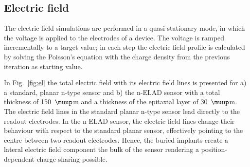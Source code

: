 \documentclass[a4paper,11pt]{article}
\begin{document}
\subsection{Electric field}
\label{sec:ef}
The electric field simulations are performed in a quasi-stationary mode, in which the voltage is applied to the electrodes of a device.
The voltage is ramped incrementally to a target value; in each step the electric field profile is calculated
 by solving the Poisson's equation with the charge density from the previous iteration as starting value.

In Fig.~\ref{fig:el} the total electric field with its electric field lines is presented for a) a standard, planar n-type sensor and b) the n-ELAD sensor
 with a total thickness of 150~$\muup$m and a thickness of the epitaxial layer of 30~$\muup$m.
The electric field lines in the standard planar n-type sensor lead directly to the readout electrodes. 
In the n-ELAD sensor, the electric field lines change their behaviour with respect to the standard planar sensor, effectively pointing to the centre between two readout electrodes. 
Hence, the buried implants create a lateral electric field component the bulk of the sensor rendering a position-dependent charge sharing possible.
\end{document}
